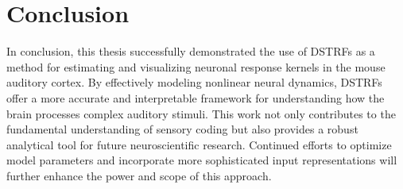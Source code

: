 \section{Conclusion}
In conclusion, this thesis successfully demonstrated the use of DSTRFs as a method for estimating and visualizing neuronal response kernels in the mouse auditory cortex. By effectively modeling nonlinear neural dynamics, DSTRFs offer a more accurate and interpretable framework for understanding how the brain processes complex auditory stimuli. This work not only contributes to the fundamental understanding of sensory coding but also provides a robust analytical tool for future neuroscientific research. Continued efforts to optimize model parameters and incorporate more sophisticated input representations will further enhance the power and scope of this approach.




